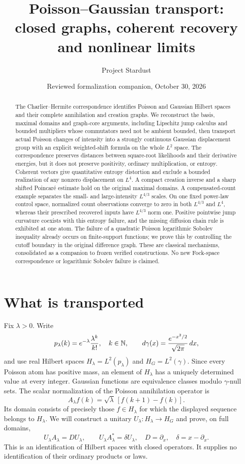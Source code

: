 \documentclass[11pt]{article}
\title{Poisson--Gaussian transport:\\closed graphs, coherent recovery and nonlinear limits}
\author{Project Stardust}
\date{Reviewed formalization companion, October 30, 2026}
\begin{document}
\maketitle
\begin{abstract}
The Charlier--Hermite correspondence identifies Poisson and Gaussian
Hilbert spaces and their complete annihilation and creation graphs.
We reconstruct the basis, maximal domains and graph-core arguments,
including Lipschitz jump calculus and bounded multipliers whose
commutators need not be ambient bounded,
then transport actual Poisson changes of intensity into a strongly
continuous Gaussian displacement group with an explicit weighted-shift
formula on the whole $L^2$ space. The correspondence preserves distances
between square-root likelihoods and their derivative energies, but it
does not preserve positivity, ordinary multiplication, or entropy.
Coherent vectors give quantitative entropy distortion and exclude a
bounded realization of any nonzero displacement on $L^4$.
A compact creation inverse and a sharp shifted Poincar\'e estimate hold on the original maximal domains. A compensated-count example separates the small- and large-intensity $L^{4/3}$ scales. On one fixed power-law control space, normalized count observations converge to zero in both $L^{4/3}$ and $L^4$, whereas their prescribed recovered inputs have $L^{4/3}$ norm one.
Positive pointwise jump curvature coexists with this entropy failure,
and the missing diffusion chain rule is exhibited at one atom.
The failure of a quadratic Poisson logarithmic Sobolev inequality already
occurs on finite-support functions; we prove this by controlling the
cutoff boundary in the original difference graph. These are classical
mechanisms, consolidated as a companion to frozen verified constructions.
No new Fock-space correspondence or logarithmic Sobolev failure is claimed.
\end{abstract}

\section{What is transported}
Fix $\lambda>0$. Write
\[
 p_\lambda(k)=e^{-\lambda}\frac{\lambda^k}{k!},\quad k\in\mathbb N,
 \qquad d\gamma(x)=\frac{e^{-x^2/2}}{\sqrt{2\pi}}\,dx,
\]
and use real Hilbert spaces $H_\lambda=L^2(p_\lambda)$ and
$H_G=L^2(\gamma)$. Since every Poisson atom has positive mass, an element
of $H_\lambda$ has a uniquely determined value at every integer.
Gaussian functions are equivalence classes modulo $\gamma$-null sets.
The scalar normalization of the Poisson annihilation operator is
\begin{equation}\label{eq:A}
 A_\lambda f(k)=\sqrt\lambda\,[f(k+1)-f(k)].
\end{equation}
Its domain consists of precisely those $f\in H_\lambda$ for which
the displayed sequence belongs to $H_\lambda$. We will construct a
unitary $U_\lambda:H_\lambda\to H_G$ and prove, on full domains,
\[
 U_\lambda A_\lambda=D U_\lambda,\qquad
 U_\lambda A_\lambda^*=\delta U_\lambda,
 \quad D=\partial_x,\quad\delta=x-\partial_x.
\]
This is an identification of Hilbert spaces with closed operators.
It supplies no identification of their ordinary products or laws.
\end{document}
